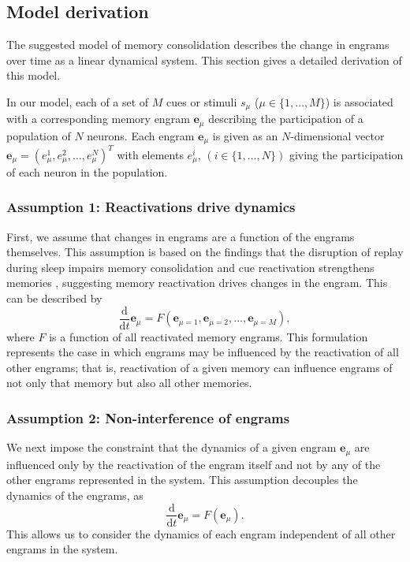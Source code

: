 \subsection{Model derivation}
\label{sub:model-derivation}

The suggested model of memory consolidation describes the change in engrams over time as a linear dynamical system. This section gives a detailed derivation of this model.

In our model, each of a set of $M$ cues or stimuli $s_\mu$ ($\mu \in \{1,\ldots,M\}$) is associated with a corresponding memory engram $\mathbf{e}_\mu$ describing the participation of a population of $N$ neurons. Each engram $\mathbf{e}_\mu$ is given as an $N$-dimensional vector $\mathbf{e}_\mu = (e_{\mu}^1, e_{\mu}^2, \ldots, e_{\mu}^N)^T$ with elements $e_{\mu}^i, \, (i \in \{1, \ldots, N\})$ giving the participation of each neuron in the population. 

\subsubsection*{Assumption 1: Reactivations drive dynamics}

First, we assume that changes in engrams are a function of the engrams themselves. This assumption is based on the findings that the disruption of replay during sleep impairs memory consolidation \citep{Girardeau2009} and cue reactivation strengthens memories \citep{Rasch2007a}, suggesting memory reactivation drives changes in the engram. This can be described by
%
\begin{equation}\label{eq:general_dynamics}
  \frac{\mathrm{d}}{\mathrm{d}t} \mathbf{e}_\mu = F(\mathbf{e}_{\mu=1}, \mathbf{e}_{\mu=2}, \ldots, \mathbf{e}_{\mu=M}),
\end{equation}
%
where $F$ is a function of all reactivated memory engrams. This formulation represents the case in which engrams may be influenced by the reactivation of all other engrams; that is, reactivation of a given memory can influence engrams of not only that memory but also all other memories.

\subsubsection*{Assumption 2: Non-interference of engrams}

We next impose the constraint that the dynamics of a given engram $\mathbf{e}_\mu$ are influenced only by the reactivation of the engram itself and not by any of the other engrams represented in the system. This assumption decouples the dynamics of the engrams, as
%
\begin{equation}\label{eq:decoupled_dynamics}
  \frac{\mathrm{d}}{\mathrm{d}t} \mathbf{e}_\mu = F(\mathbf{e}_\mu).
\end{equation}
%
This allows us to consider the dynamics of each engram independent of all other engrams in the system.

